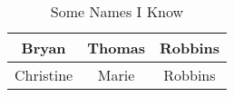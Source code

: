 \begin{table*}
\centering
\caption{Some Names I Know}
\begin{tabular}{|c|c|c|} \hline
Bryan	&	Thomas	&	Robbins\\\hline
Christine	&	Marie	&	Robbins\\\hline
\hline\end{tabular}
\end{table*}
